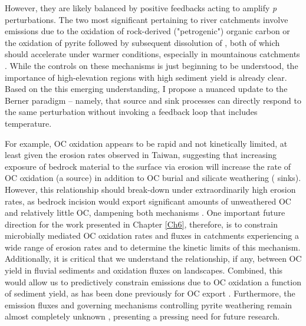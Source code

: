 However, they are likely balanced by positive feedbacks acting to amplify \textit{p} perturbations. The two most significant pertaining to river catchments involve  emissions due to the oxidation of rock-derived ("petrogenic") organic carbon \citep[OC;][Chapter \ref{Ch6}]{Hilton:2014dh} or the oxidation of pyrite followed by subsequent dissolution of  \citep{Torres:2014cx}, both of which should accelerate under warmer conditions, especially in mountainous catchments \citep{Torres:2016bd}. While the controls on these mechanisms is just beginning to be understood, the importance of high-elevation regions with high sediment yield is already clear. Based on the this emerging understanding, I propose a nuanced update to the Berner paradigm -- namely, that  source and sink processes can directly respond to the same perturbation without invoking a feedback loop that includes temperature.

For example, OC oxidation appears to be rapid and not kinetically limited, at least given the erosion rates observed in Taiwan, suggesting that increasing exposure of bedrock material to the surface via erosion will increase the rate of OC oxidation (a  source) in addition to OC burial and silicate weathering ( sinks). However, this relationship should break-down under extraordinarily high erosion rates, as bedrock incision would export significant amounts of unweathered OC and relatively little OC, dampening both mechanisms \citep{Hilton:2011jw}. One important future direction for the work presented in Chapter \ref{Ch6}, therefore, is to constrain microbially mediated OC oxidation rates and fluxes in catchments experiencing a wide range of erosion rates and to determine the kinetic limits of this mechanism. Additionally, it is critical that we understand the relationship, if any, between OC yield in fluvial sediments and oxidation fluxes on landscapes. Combined, this would allow us to predictively constrain  emissions due to OC oxidation a function of sediment yield, as has been done previously for OC export \citep{Galy:2015fx}. Furthermore, the  emission fluxes and governing mechanisms controlling pyrite weathering remain almost completely unknown \citep{Calmels:2007fk,Torres:2014cx}, presenting a pressing need for future research. 

